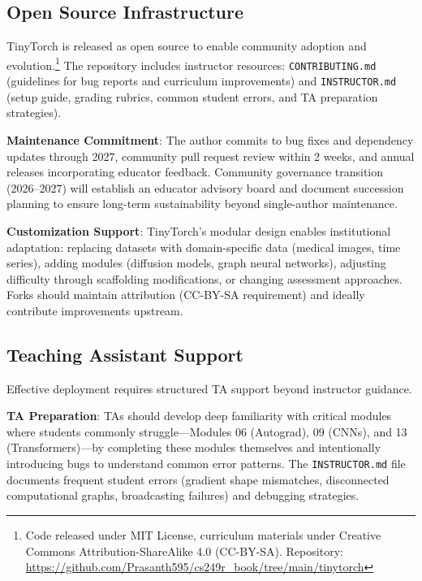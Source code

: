 \documentclass[10pt,twocolumn]{article}
\begin{document}
\subsection{Open Source Infrastructure}
\label{subsec:opensource}

TinyTorch is released as open source to enable community adoption and evolution.\footnote{Code released under MIT License, curriculum materials under Creative Commons Attribution-ShareAlike 4.0 (CC-BY-SA). Repository: \url{https://github.com/Prasanth595/cs249r_book/tree/main/tinytorch}} The repository includes instructor resources: \texttt{CONTRIBUTING.md} (guidelines for bug reports and curriculum improvements) and \texttt{INSTRUCTOR.md} (setup guide, grading rubrics, common student errors, and TA preparation strategies).

\textbf{Maintenance Commitment}: The author commits to bug fixes and dependency updates through 2027, community pull request review within 2 weeks, and annual releases incorporating educator feedback. Community governance transition (2026--2027) will establish an educator advisory board and document succession planning to ensure long-term sustainability beyond single-author maintenance.

\textbf{Customization Support}: TinyTorch's modular design enables institutional adaptation: replacing datasets with domain-specific data (medical images, time series), adding modules (diffusion models, graph neural networks), adjusting difficulty through scaffolding modifications, or changing assessment approaches. Forks should maintain attribution (CC-BY-SA requirement) and ideally contribute improvements upstream.

\subsection{Teaching Assistant Support}
\label{subsec:ta-support}

Effective deployment requires structured TA support beyond instructor guidance.

\textbf{TA Preparation}: TAs should develop deep familiarity with critical modules where students commonly struggle---Modules 06 (Autograd), 09 (CNNs), and 13 (Transformers)---by completing these modules themselves and intentionally introducing bugs to understand common error patterns. The \texttt{INSTRUCTOR.md} file documents frequent student errors (gradient shape mismatches, disconnected computational graphs, broadcasting failures) and debugging strategies.
\end{document}
